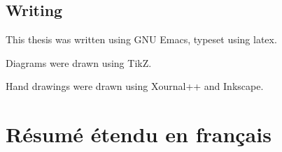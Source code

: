 \documentclass[../main.tex]{subfiles}
\begin{document}
\section{Writing}
This thesis was written using GNU Emacs, typeset using \gls{latex}.

Diagrams were drawn using \gls{TikZ}.

Hand drawings were drawn using Xournal++ and Inkscape.

\chapter{Résumé étendu en français}
\end{document}
